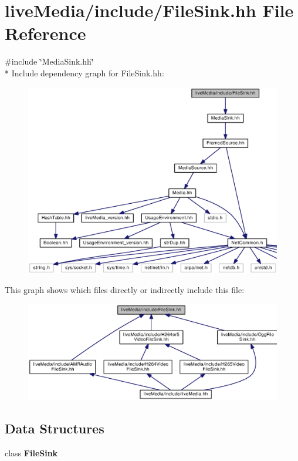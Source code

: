 \section{live\+Media/include/\+File\+Sink.hh File Reference}
\label{FileSink_8hh}
{\ttfamily \#include \char`\"{}Media\+Sink.\+hh\char`\"{}}\\*
Include dependency graph for File\+Sink.\+hh\+:
\nopagebreak
\begin{figure}[H]
\begin{center}
\leavevmode
\includegraphics[width=350pt]{FileSink_8hh__incl}
\end{center}
\end{figure}
This graph shows which files directly or indirectly include this file\+:
\nopagebreak
\begin{figure}[H]
\begin{center}
\leavevmode
\includegraphics[width=350pt]{FileSink_8hh__dep__incl}
\end{center}
\end{figure}
\subsection*{Data Structures}
\begin{DoxyCompactItemize}
\item 
class {\bf File\+Sink}
\end{DoxyCompactItemize}

